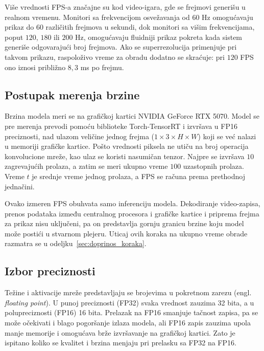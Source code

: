 \documentclass[12pt,a4paper]{article}
\begin{document}
Više vrednosti FPS-a značajne su kod video-igara, gde se frejmovi generišu u realnom vremenu. Monitori sa frekvencijom osvežavanja od $60$ Hz omogućavaju prikaz do $60$ različitih frejmova u sekundi, dok monitori sa višim frekvencijama, poput $120$, $180$ ili $200$ Hz, omogućavaju fluidniji prikaz pokreta kada sistem generiše odgovarajući broj frejmova. Ako se superrezolucija primenjuje pri takvom prikazu, raspoloživo vreme za obradu dodatno se skraćuje: pri $120$ FPS ono iznosi približno $8{,}3$ ms po frejmu.

\subsection{Postupak merenja brzine}

Brzina modela meri se na grafičkoj kartici NVIDIA GeForce RTX 5070. Model se pre merenja prevodi pomoću biblioteke Torch-TensorRT \cite{TorchTensorRT} i izvršava u FP16 preciznosti, nad ulazom veličine jednog frejma ($1\times3\times H\times W$) koji se već nalazi u memoriji grafičke kartice. Pošto vrednosti piksela ne utiču na broj operacija konvolucione mreže, kao ulaz se koristi nasumičan tenzor. Najpre se izvršava $10$ zagrevajućih prolaza, a zatim se meri ukupno vreme $100$ uzastopnih prolaza. Vreme $t$ je srednje vreme jednog prolaza, a FPS se računa prema prethodnoj jednačini.

Ovako izmeren FPS obuhvata samo inferenciju modela. Dekodiranje video-zapisa, prenos podataka između centralnog procesora i grafičke kartice i priprema frejma za prikaz nisu uključeni, pa on predstavlja gornju granicu brzine koju model može postići u stvarnom plejeru. Uticaj ovih koraka na ukupno vreme obrade razmatra se u odeljku~\ref{sec:doprinos_koraka}.

\subsection{Izbor preciznosti}
\label{sec:preciznost}

Težine i aktivacije mreže predstavljaju se brojevima u pokretnom zarezu (engl. \textit{floating point}). U punoj preciznosti (FP32) svaka vrednost zauzima 32 bita, a u polupreciznosti (FP16) 16 bita. Prelazak na FP16 smanjuje tačnost zapisa, pa se može očekivati i blago pogoršanje izlaza modela, ali FP16 zapis zauzima upola manje memorije i omogućava brže izvršavanje na grafičkoj kartici. Zato je ispitano koliko se kvalitet i brzina menjaju pri prelasku sa FP32 na FP16.
\end{document}
